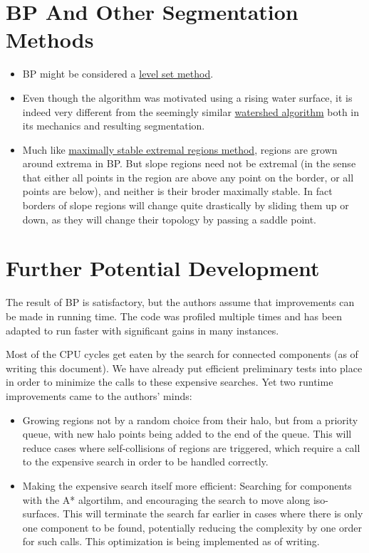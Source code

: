 \documentclass[a4paper,12pt,notitlepage,fullpage]{paper}
\theoremstyle{plain}
\theoremstyle{definition}
\begin{document}
\section{BP And Other Segmentation Methods}
\begin{itemize}
\item BP might be considered a \href{https://en.wikipedia.org/wiki/Level-set_method}{level set method}.
\item Even though the algorithm was motivated using a rising water surface, it is indeed very different from the seemingly similar \href{https://en.wikipedia.org/wiki/Watershed_(image_processing)}{watershed algorithm} both in its mechanics and resulting segmentation.
\item Much like \href{https://en.wikipedia.org/wiki/Maximally_stable_extremal_regions}{maximally stable extremal regions method}, regions are grown around extrema in BP. But slope regions need not be extremal (in the sense that either all points in the region are above any point on the border, or all points are below), and neither is their broder maximally stable. In fact borders of slope regions will change quite drastically by sliding them up or down, as they will change their topology by passing a saddle point.
\end{itemize}


\section{Further Potential Development}
The result of BP is satisfactory, but the authors assume that improvements can be made in running time. The code was profiled multiple times and has been adapted to run faster with significant gains in many instances.

Most of the CPU cycles get eaten by the search for connected components (as of writing this document). We have already put efficient preliminary tests into place in order to minimize the calls to these expensive searches. Yet two runtime improvements came to the authors' minds:
\begin{itemize}
\item Growing regions not by a random choice from their halo, but from a priority queue, with new halo points being added to the end of the queue. This will reduce cases where self-collisions of regions are triggered, which require a call to the expensive search in order to be handled correctly.
\item Making the expensive search itself more efficient: Searching for components with the A* algortihm, and encouraging the search to move along iso-surfaces. This will terminate the search far earlier in cases where there is only one component to be found, potentially reducing the complexity by one order for such calls. This optimization is being implemented as of writing.
\end{itemize}
\end{document}
